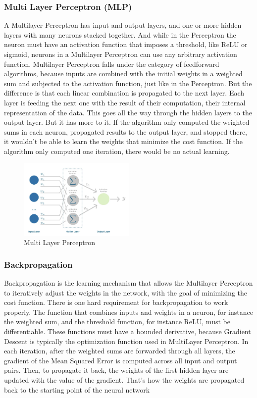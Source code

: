 \documentclass{article}
\begin{document}
\subsubsection{Multi Layer Perceptron (MLP)}
A Multilayer Perceptron has input and output layers, and one or more hidden layers with many neurons stacked together. And while in the Perceptron the neuron must have an activation function that imposes a threshold, like ReLU or sigmoid, neurons in a Multilayer Perceptron can use any arbitrary activation function.
Multilayer Perceptron falls under the category of feedforward algorithms, because inputs are combined with the initial weights in a weighted sum and subjected to the activation function, just like in the Perceptron. But the difference is that each linear combination is propagated to the next layer.
Each layer is feeding the next one with the result of their computation, their internal representation of the data. This goes all the way through the hidden layers to the output layer.
But it has more to it.
If the algorithm only computed the weighted sums in each neuron, propagated results to the output layer, and stopped there, it wouldn’t be able to learn the weights that minimize the cost function. If the algorithm only computed one iteration, there would be no actual learning.

\begin{figure}[H]
    \centering
    \includegraphics[width=0.5\textwidth]{images/MLP.png}
    \caption{Multi Layer Perceptron}
\end{figure}

\subsubsection{Backpropagation}
Backpropagation is the learning mechanism that allows the Multilayer Perceptron to iteratively adjust the weights in the network, with the goal of minimizing the cost function.
There is one hard requirement for backpropagation to work properly. The function that combines inputs and weights in a neuron, for instance the weighted sum, and the threshold function, for instance ReLU, must be differentiable. These functions must have a bounded derivative, because Gradient Descent is typically the optimization function used in MultiLayer Perceptron.
In each iteration, after the weighted sums are forwarded through all layers, the gradient of the Mean Squared Error is computed across all input and output pairs. Then, to propagate it back, the weights of the first hidden layer are updated with the value of the gradient. That’s how the weights are propagated back to the starting point of the neural network
\end{document}
